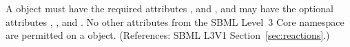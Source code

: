 A \Reaction object must have the required attributes ,
 and , and may have the optional attributes
, ,  and .  No
other attributes from the SBML Level~3 Core namespace are permitted on a
\Reaction object.  (References: SBML L3V1 Section~\ref{sec:reactions}.)
